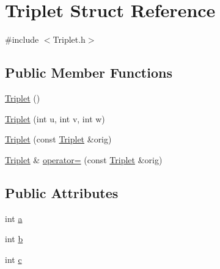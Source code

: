 \hypertarget{structTriplet}{
\section{Triplet Struct Reference}
\label{structTriplet}
}


{\ttfamily \#include $<$Triplet.h$>$}

\subsection*{Public Member Functions}
\begin{DoxyCompactItemize}
\item 
\hyperlink{structTriplet_ae4f7691a592a571ae6f5aaaa4fc953f3}{Triplet} ()
\item 
\hyperlink{structTriplet_a70457ef6a05b29f73ebcd8f9270797e3}{Triplet} (int u, int v, int w)
\item 
\hyperlink{structTriplet_aa6d4bab5cc79da13ed8ac1797b116838}{Triplet} (const \hyperlink{structTriplet}{Triplet} \&orig)
\item 
\hyperlink{structTriplet}{Triplet} \& \hyperlink{structTriplet_a39e9b4fa3119643737509863defa67ce}{operator=} (const \hyperlink{structTriplet}{Triplet} \&orig)
\end{DoxyCompactItemize}
\subsection*{Public Attributes}
\begin{DoxyCompactItemize}
\item 
int \hyperlink{structTriplet_a8f29696c8699a74d729762bd4ac021e0}{a}
\item 
int \hyperlink{structTriplet_ab04c763889df0502639bc2020f445057}{b}
\item 
int \hyperlink{structTriplet_a55aeb5803c35b59e170160588c090dbb}{c}
\end{DoxyCompactItemize}


